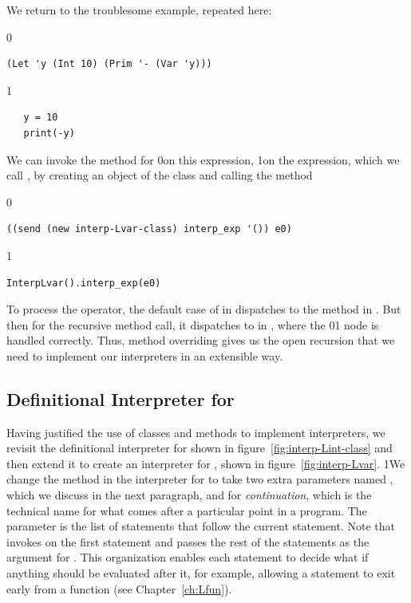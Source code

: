 \documentclass[7x10]{TimesAPriori_MIT}%
\def\racketEd{0}
\def\pythonEd{1}
\def\edition{1}
\newcommand{\racket}[1]{{\if\edition\racketEd{#1}\fi}}
\newcommand{\pythonColor}[0]{}
\newcommand{\python}[1]{{\if\edition\pythonEd\pythonColor #1\fi}}
\numberwithin{theorem}{chapter}
\numberwithin{definition}{chapter}
\numberwithin{equation}{chapter}
\begin{document}
We return to the troublesome example, repeated here:
{\if\edition\racketEd  
\begin{lstlisting}
(Let 'y (Int 10) (Prim '- (Var 'y)))
\end{lstlisting}
\fi}
{\if\edition\pythonEd\pythonColor
\begin{lstlisting}
   y = 10
   print(-y)
\end{lstlisting}
\fi}
\noindent We can invoke the  method for \LangVar{}%
\racket{on this expression,}
\python{on the  expression,}
%
which we call , by creating an object of the \LangVar{} class
and calling the  method
{\if\edition\racketEd
\begin{lstlisting}
((send (new interp-Lvar-class) interp_exp '()) e0)
\end{lstlisting}
\fi}
{\if\edition\pythonEd\pythonColor
\begin{lstlisting}
InterpLvar().interp_exp(e0)
\end{lstlisting}
\fi}
\noindent To process the \code{-} operator, the default case of
 in \LangVar{} dispatches to the 
method in \LangInt{}. But then for the recursive method call, it
dispatches to  in \LangVar{}, where the
\racket{}\python{} node is handled correctly.
Thus, method overriding gives us the open recursion that we need to
implement our interpreters in an extensible way.


\subsection{Definitional Interpreter for \LangVar{}}
\label{sec:interp-Lvar}

Having justified the use of classes and methods to implement
interpreters, we revisit the definitional interpreter for \LangInt{}
shown in figure~\ref{fig:interp-Lint-class} and then extend it to
create an interpreter for \LangVar{}, shown in
figure~\ref{fig:interp-Lvar}.
%
\python{We change the  method in the interpreter
  for \LangInt{} to take two extra parameters named \code{env}, which
  we discuss in the next paragraph, and \code{cont} for
  \emph{continuation}, which is the technical name for what comes
  after a particular point in a program. The \code{cont} parameter is
  the list of statements that follow the current statement.  Note
  that \code{interp\_stmts} invokes \code{interp\_stmt} on the first
  statement and passes the rest of the statements as the argument for
  \code{cont}. This organization enables each statement to decide what
  if anything should be evaluated after it, for example, allowing a
  \code{return} statement to exit early from a function (see
  Chapter~\ref{ch:Lfun}).}
\end{document}
